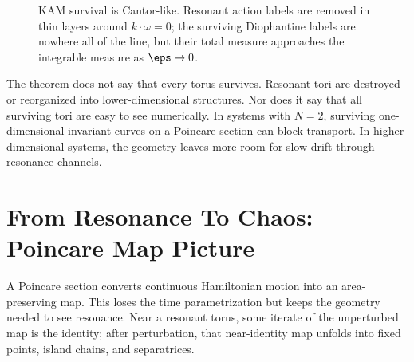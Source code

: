 \begin{figure}[htbp]
\centering
{}
\caption{KAM survival is Cantor-like. Resonant action labels are removed in
thin layers around \(k\cdot\omega=0\); the surviving Diophantine labels are
nowhere all of the line, but their total measure approaches the integrable
measure as \(\eps\to0\).}
\label{fig:kam-cantor-survival}
\end{figure}

The theorem does not say that every torus survives. Resonant tori are destroyed
or reorganized into lower-dimensional structures. Nor does it say that all
surviving tori are easy to see numerically. In systems with \(N=2\), surviving
one-dimensional invariant curves on a Poincare section can block transport. In
higher-dimensional systems, the geometry leaves more room for slow drift
through resonance channels.

\section{From Resonance To Chaos: Poincare Map Picture}
\label{sec:poincare-resonance-chaos}

A Poincare section converts continuous Hamiltonian motion into an
area-preserving map. This loses the time parametrization but keeps the geometry
needed to see resonance. Near a resonant torus, some iterate of the unperturbed
map is the identity; after perturbation, that near-identity map unfolds into
fixed points, island chains, and separatrices.

